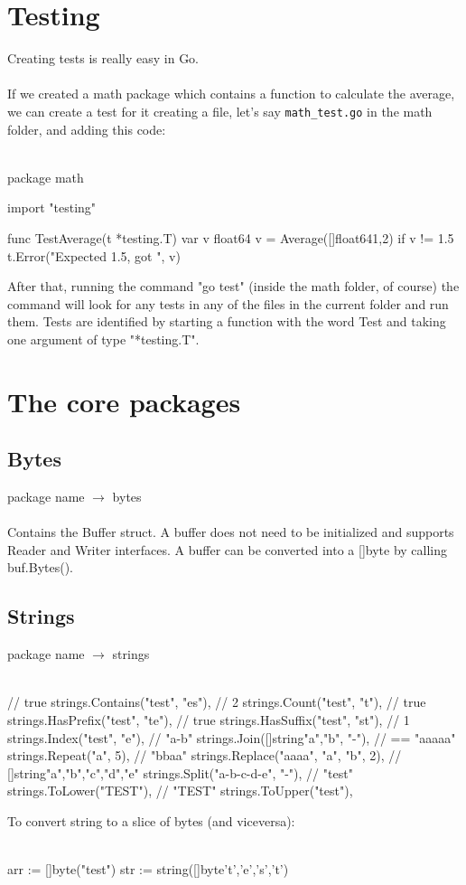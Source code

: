 \documentclass[twoside,a4paper,english]{report}
\begin{document}
\chapter{Testing}
Creating tests is really easy in Go.\\\\
If we created a math package which contains a function to calculate the average, we can create a test for it creating a file, let's say \verb|math_test.go| in the math folder, and adding this code:\\\\
\begin{go}
package math

import "testing"

func TestAverage(t *testing.T) {
    var v float64
    v = Average([]float64{1,2})
    if v != 1.5 {
           t.Error("Expected 1.5, got ", v)
    }
}
\end{go}
After that, running the command "go test" (inside the math folder, of course) the command will look for any tests in any of the files in the current folder and run them. Tests are identified by starting a function with the word Test and taking one argument of type "*testing.T".

\chapter{The core packages}
\section{Bytes}
package name $\rightarrow$ bytes\\\\
Contains the Buffer struct. A buffer does not need to be initialized and supports Reader and Writer interfaces. A buffer can be converted into a []byte by calling buf.Bytes().
\section{Strings}
package name $\rightarrow$ strings\\\\
\begin{go}
// true
strings.Contains("test", "es"),
// 2
strings.Count("test", "t"),
// true
strings.HasPrefix("test", "te"),
// true
strings.HasSuffix("test", "st"),
// 1
strings.Index("test", "e"),
// "a-b"
strings.Join([]string{"a","b"}, "-"),
// == "aaaaa"
strings.Repeat("a", 5),
// "bbaa"
strings.Replace("aaaa", "a", "b", 2),
// []string{"a","b","c","d","e"}
strings.Split("a-b-c-d-e", "-"),
// "test"
strings.ToLower("TEST"),
// "TEST"
strings.ToUpper("test"),

\end{go}
To convert string to a slice of bytes (and viceversa):\\\\
\begin{go}
arr := []byte("test")
str := string([]byte{'t','e','s','t'})
\end{go}
\end{document}
